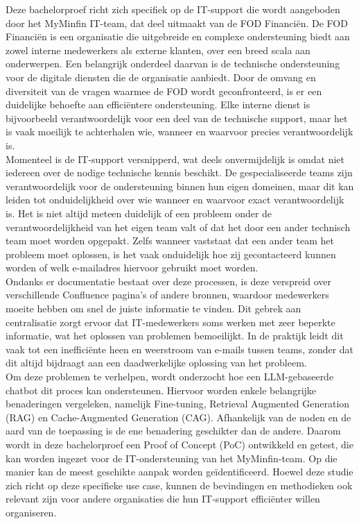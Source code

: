 Deze bachelorproef richt zich specifiek op de IT-support die wordt aangeboden door het MyMinfin IT-team, dat deel uitmaakt van de FOD Financiën. De FOD Financiën is een organisatie die uitgebreide en complexe ondersteuning biedt aan zowel interne medewerkers als externe klanten, over een breed scala aan onderwerpen. Een belangrijk onderdeel daarvan is de technische ondersteuning voor de digitale diensten die de organisatie aanbiedt. Door de omvang en diversiteit van de vragen waarmee de FOD wordt geconfronteerd, is er een duidelijke behoefte aan efficiëntere ondersteuning. Elke interne dienst is bijvoorbeeld verantwoordelijk voor een deel van de technische support, maar het is vaak moeilijk te achterhalen wie, wanneer en waarvoor precies verantwoordelijk is.
\\[1em]
Momenteel is de IT-support versnipperd, wat deels onvermijdelijk is omdat niet iedereen over de nodige technische kennis beschikt. De gespecialiseerde teams zijn verantwoordelijk voor de ondersteuning binnen hun eigen domeinen, maar dit kan leiden tot onduidelijkheid over wie wanneer en waarvoor exact verantwoordelijk is. Het is niet altijd meteen duidelijk of een probleem onder de verantwoordelijkheid van het eigen team valt of dat het door een ander technisch team moet worden opgepakt. Zelfs wanneer vaststaat dat een ander team het probleem moet oplossen, is het vaak onduidelijk hoe zij gecontacteerd kunnen worden of welk e-mailadres hiervoor gebruikt moet worden.
\\[1em]
Ondanks er documentatie bestaat over deze processen, is deze verspreid over verschillende Confluence pagina’s of andere bronnen, waardoor medewerkers moeite hebben om snel de juiste informatie te vinden. Dit gebrek aan centralisatie zorgt ervoor dat IT-medewerkers soms werken met zeer beperkte informatie, wat het oplossen van problemen bemoeilijkt. In de praktijk leidt dit vaak tot een inefficiënte heen en weerstroom van e-mails tussen teams, zonder dat dit altijd bijdraagt aan een daadwerkelijke oplossing van het probleem.
\\[1em]
Om deze problemen te verhelpen, wordt onderzocht hoe een LLM-gebaseerde chatbot dit proces kan ondersteunen. Hiervoor worden enkele belangrijke benaderingen vergeleken, namelijk Fine-tuning, Retrieval Augmented Generation (RAG) en Cache-Augmented Generation (CAG). Afhankelijk van de noden en de aard van de toepassing is de ene benadering geschikter dan de andere. Daarom wordt in deze bachelorproef een Proof of Concept (PoC) ontwikkeld en getest, die kan worden ingezet voor de IT-ondersteuning van het MyMinfin-team. Op die manier kan de meest geschikte aanpak worden geïdentificeerd. Hoewel deze studie zich richt op deze specifieke use case, kunnen de bevindingen en methodieken ook relevant zijn voor andere organisaties die hun IT-support efficiënter willen organiseren.

